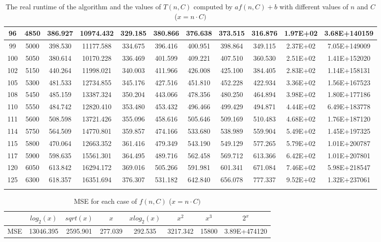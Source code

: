 \documentclass{article}
\begin{document}
\begin{center}
\begin{longtable}{|c|c|c|c|c|c|c|c|c|c|c|}
96	&	4850	&	386.927	&	10974.432	&	329.185	&	380.866	&	376.638	&	373.515	&	316.876	&	1.97E+02	&	3.68E+140159	\\	\hline
99	&	5000	&	398.530	&	11177.588	&	334.675	&	396.416	&	400.951	&	398.864	&	349.115	&	2.37E+02	&	7.05E+149009	\\	\hline
100	&	5050	&	380.614	&	10170.228	&	336.469	&	401.599	&	409.221	&	407.510	&	360.530	&	2.51E+02	&	1.41E+152020	\\	\hline
102	&	5150	&	440.264	&	11998.021	&	340.003	&	411.966	&	426.008	&	425.100	&	384.405	&	2.83E+02	&	1.14E+158131	\\	\hline
105	&	5300	&	481.533	&	12734.855	&	345.176	&	427.516	&	451.810	&	452.228	&	422.934	&	3.36E+02	&	1.56E+167523	\\	\hline
108	&	5450	&	485.159	&	13387.324	&	350.204	&	443.066	&	478.356	&	480.250	&	464.894	&	3.98E+02	&	1.80E+177186	\\	\hline
110	&	5550	&	484.742	&	12820.410	&	353.480	&	453.432	&	496.466	&	499.429	&	494.871	&	4.44E+02	&	6.49E+183778	\\	\hline
111	&	5600	&	508.598	&	13721.426	&	355.096	&	458.616	&	505.646	&	509.169	&	510.483	&	4.68E+02	&	1.76E+187120	\\	\hline
114	&	5750	&	564.509	&	14770.801	&	359.857	&	474.166	&	533.680	&	538.989	&	559.904	&	5.49E+02	&	1.45E+197325	\\	\hline
115	&	5800	&	470.064	&	12663.352	&	361.416	&	479.349	&	543.190	&	549.129	&	577.265	&	5.79E+02	&	1.01E+200787	\\	\hline
117	&	5900	&	598.635	&	15561.301	&	364.495	&	489.716	&	562.458	&	569.712	&	613.366	&	6.42E+02	&	1.01E+207801	\\	\hline
120	&	6050	&	613.842	&	16294.172	&	369.016	&	505.266	&	591.981	&	601.341	&	671.084	&	7.46E+02	&	5.98E+218547	\\	\hline
125	&	6300	&	618.357	&	16351.694	&	376.307	&	531.182	&	642.840	&	656.078	&	777.337	&	9.52E+02	&	1.32E+237061	\\	\hline

     \caption{The real runtime of the algorithm and the values of $T(n,C)$ computed by $af(n,C) + b$ with different values of $n$ and $C$ ($x = n\cdot C)$}
    \end{longtable}
\begin{table}[H]
    \begin{adjustbox}{width=1.1\textwidth,center}
         \begin{tabular}{|c|c|c|c|c|c|c|c|}
        \hline
        {} & $log_2(x)$ & $sqrt(x)$ & $x$ & $xlog_2(x)$ & $x^2$ & $x^3$ & $2^x$ \\
        \hline
        MSE & 13046.395	&	2595.901	&	277.039	&	292.535	&	3217.342	&	15800	&	3.89E+474120  \\  \hline
        \end{tabular}
    \end{adjustbox}
    \caption{MSE for each case of $f(n,C)$ ($x = n\cdot C)$} 
\end{table}    
\end{center}
\end{document}
